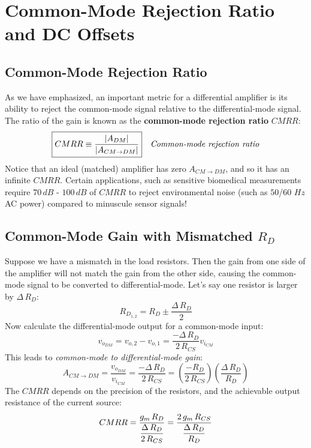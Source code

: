 \section{Common-Mode Rejection Ratio and DC Offsets}
\label{sec:cmrr}
\subsection{Common-Mode Rejection Ratio}
As we have emphasized, an important metric for a differential amplifier is its ability to reject the common-mode signal relative to the differential-mode signal.  The ratio of the gain is known as the \textbf{common-mode rejection ratio} $CMRR$:
    \begin{align} 
        \Aboxed{CMRR &\equiv \frac{\left|A_{DM}\right|}{\left|A_{CM \to DM}\right|}}
        &\textit{Common-mode rejection ratio}
        \label{eq:cmrr_definition}
    \end{align}
Notice that an ideal (matched) amplifier has zero $A_{CM \to DM}$, and so it has an infinite $CMRR$. Certain applications, such as sensitive biomedical measurements require $70\,dB$ - $100\,dB$ of $CMRR$ to reject environmental noise (such as $50$/$60$ $Hz$ AC power) compared to minuscule sensor signals!
\subsection{Common-Mode Gain with Mismatched \texorpdfstring{$R_D$}{Load Resistance}}
Suppose we have a mismatch in the load resistors.  Then the gain from one side of the amplifier will not match the gain from the other side, causing the common-mode signal to be converted to differential-mode.  Let's say one resistor is larger by $\Delta\,R_{D}$:
    \begin{equation} 
        R_{D_{1,2}} = R_D \pm \frac{\Delta\,R_D}{2}
    \end{equation}
Now calculate the differential-mode output for a common-mode input:
    \begin{equation}
        v_{o_{DM}} = v_{o,2} - v_{o,1} = \frac{-\Delta\,R_D}{2\,R_{CS}}v_{i_{CM}}
    \end{equation}
This leads to \textit{common-mode to differential-mode gain}:
    \begin{equation} 
        A_{CM \to DM} = \frac{v_{o_{DM}}}{v_{i_{CM}}}
        = \frac{-\Delta\,R_D}{2\,R_{CS}}
        = \left(\frac{-R_D}{2\,R_{CS}}\right) \left(\frac{\Delta\,R_D}{R_D}\right)
    \end{equation}
The $CMRR$ depends on the precision of the resistors, and the achievable output resistance of the current source:
    \begin{equation} 
        CMRR = \frac{g_m\,R_D}{\mathlarger{\frac{\Delta\,R_D}{2\,R_{CS}}}}
        = \frac{2\,g_m\,R_{CS}}{\mathlarger{\frac{\Delta\,R_D}{R_D}}}
    \end{equation}
